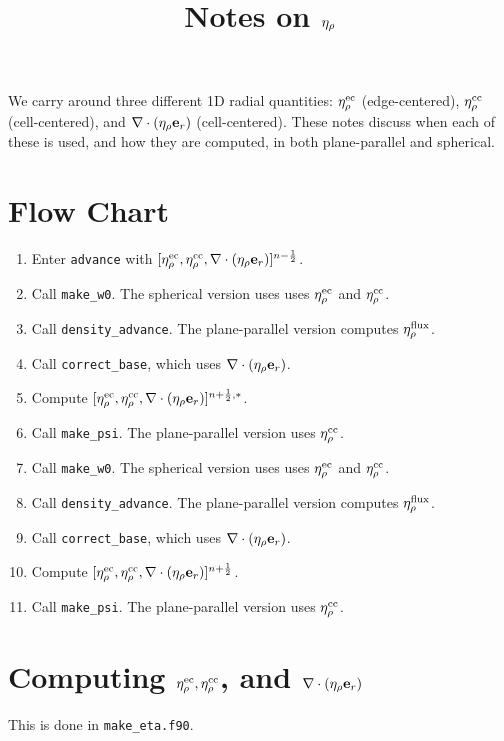 \documentclass[11pt]{article}
\title{Notes on $\etarho$}
\def\half   {\frac{1}{2}}
\def\eb         {{\bf e}}
\def\etarho     {\eta_\rho}
\def\etarhoec   {\etarho^{\rm ec}}
\def\etarhocc   {\etarho^{\rm cc}}
\def\etarhoflux {\etarho^{\rm flux}}
\def\divetarho  {\nabla\cdot(\etarho\eb_r)}
\begin{document}
\maketitle
\tableofcontents
\clearpage

We carry around three different 1D radial quantities: $\etarhoec$ (edge-centered), $\etarhocc$ (cell-centered), and $\divetarho$ (cell-centered).  These notes discuss when each of these is used, and how they are computed, in both plane-parallel and spherical.

\section{Flow Chart}
\begin{enumerate}
\item Enter {\tt advance} with $[\etarhoec, \etarhocc, \divetarho]^{n-\half}$.
\item Call {\tt make\_w0}.  The spherical version uses uses $\etarhoec$ and $\etarhocc$.
\item Call {\tt density\_advance}.  The plane-parallel version computes $\etarhoflux$.
\item Call {\tt correct\_base}, which uses $\divetarho$.
\item Compute $[\etarhoec, \etarhocc, \divetarho]^{n+\half,*}$.
\item Call {\tt make\_psi}.  The plane-parallel version uses $\etarhocc$.
\item Call {\tt make\_w0}.  The spherical version uses uses $\etarhoec$ and $\etarhocc$.
\item Call {\tt density\_advance}.  The plane-parallel version computes $\etarhoflux$.
\item Call {\tt correct\_base}, which uses $\divetarho$.
\item Compute $[\etarhoec, \etarhocc, \divetarho]^{n+\half}$.
\item Call {\tt make\_psi}.  The plane-parallel version uses $\etarhocc$.
\end{enumerate}

\section{Computing $\etarhoec, \etarhocc$, and $\divetarho$}
This is done in {\tt make\_eta.f90}.
\end{document}
